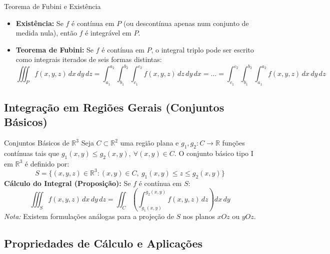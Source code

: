 \documentclass[11pt,a4paper]{article}
\newcommand{\R}{\mathbb{R}}
\begin{document}
\begin{theorembox}{Teorema de Fubini e Existência}
  \begin{itemize}
    \item \textbf{Existência:} Se $f$ é contínua em $P$ (ou descontínua apenas num conjunto de medida nula), então $f$ é integrável em $P$.
    \item \textbf{Teorema de Fubini:} Se $f$ é contínua em $P$, o integral triplo pode ser escrito como integrais iterados de seis formas distintas:
      \[ \iiint_P f(x, y, z) \, dx \, dy \, dz = \int_{a_1}^{a_2} \int_{b_1}^{b_2} \int_{c_1}^{c_2} f(x, y, z) \, dz \, dy \, dx = \dots = \int_{c_1}^{c_2} \int_{b_1}^{b_2} \int_{a_1}^{a_2} f(x, y, z) \, dx \, dy \, dz \]
  \end{itemize}
\end{theorembox}

\subsection{Integração em Regiões Gerais (Conjuntos Básicos)}

\begin{definitionbox}{Conjuntos Básicos de $\R^3$}
  Seja $C \subset \R^2$ uma região plana e $g_1, g_2 : C \to \R$ funções contínuas tais que $g_1(x,y) \le g_2(x,y), \ \forall (x,y)\in C$. O conjunto básico tipo I em $\R^3$ é definido por:
  \[ S = \{(x, y, z) \in \R^3 : (x, y) \in C, \ g_1(x, y) \le z \le g_2(x, y)\} \]
  \textbf{Cálculo do Integral (Proposição):} Se $f$ é contínua em $S$:
  \[ \iiint_S f(x, y, z) \, dx \, dy \, dz = \iint_C \left( \int_{g_1(x,y)}^{g_2(x,y)} f(x, y, z) \, dz \right) dx \, dy \]
  \textit{Nota:} Existem formulações análogas para a projeção de $S$ nos planos $xOz$ ou $yOz$.
\end{definitionbox}

\subsection{Propriedades de Cálculo e Aplicações}
\end{document}
